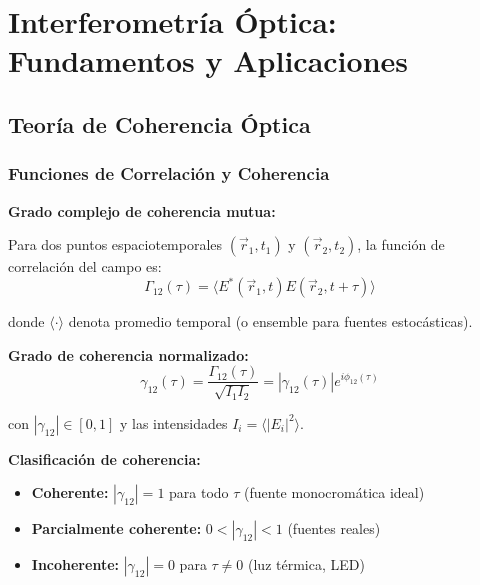 \documentclass[11pt,a4paper]{article}
\begin{document}
\section{Interferometría Óptica: Fundamentos y Aplicaciones}

\subsection{Teoría de Coherencia Óptica}

\subsubsection{Funciones de Correlación y Coherencia}

\textbf{Grado complejo de coherencia mutua:}

Para dos puntos espaciotemporales $(\vec{r}_1, t_1)$ y $(\vec{r}_2, t_2)$, la función de correlación del campo es:
\begin{equation}
    \Gamma_{12}(\tau) = \langle E^*(\vec{r}_1, t)E(\vec{r}_2, t+\tau)\rangle
\end{equation}

donde $\langle \cdot \rangle$ denota promedio temporal (o ensemble para fuentes estocásticas).

\textbf{Grado de coherencia normalizado:}
\begin{equation}
    \gamma_{12}(\tau) = \frac{\Gamma_{12}(\tau)}{\sqrt{I_1 I_2}} = |\gamma_{12}(\tau)|e^{i\phi_{12}(\tau)}
\end{equation}

con $|\gamma_{12}| \in [0, 1]$ y las intensidades $I_i = \langle|E_i|^2\rangle$.

\begin{definicion}
\textbf{Clasificación de coherencia:}
\begin{itemize}
    \item \textbf{Coherente:} $|\gamma_{12}| = 1$ para todo $\tau$ (fuente monocromática ideal)
    \item \textbf{Parcialmente coherente:} $0 < |\gamma_{12}| < 1$ (fuentes reales)
    \item \textbf{Incoherente:} $|\gamma_{12}| = 0$ para $\tau \neq 0$ (luz térmica, LED)
\end{itemize}
\end{definicion}
\end{document}
